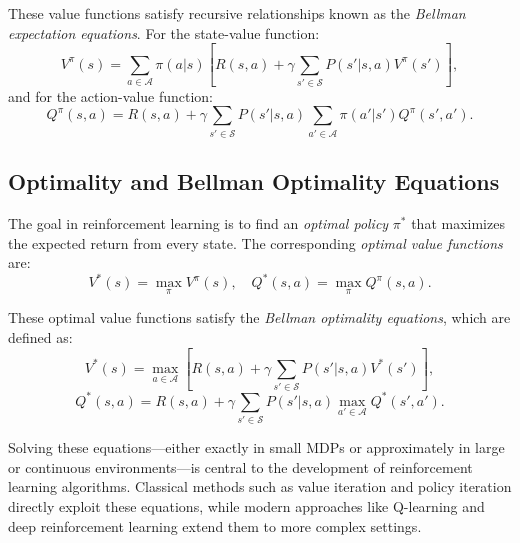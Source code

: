 These value functions satisfy recursive relationships known as the \textit{Bellman expectation equations}. For the state-value function:
\[
V^\pi(s) = \sum_{a \in \mathcal{A}} \pi(a|s) \left[ R(s, a) + \gamma \sum_{s' \in \mathcal{S}} P(s'|s, a) V^\pi(s') \right],
\]
and for the action-value function:
\[
Q^\pi(s, a) = R(s, a) + \gamma \sum_{s' \in \mathcal{S}} P(s'|s, a) \sum_{a' \in \mathcal{A}} \pi(a'|s') Q^\pi(s', a').
\]

\subsection{Optimality and Bellman Optimality Equations}

The goal in reinforcement learning is to find an \textit{optimal policy} $\pi^*$ that maximizes the expected return from every state. The corresponding \textit{optimal value functions} are:
\[
V^*(s) = \max_\pi V^\pi(s), \quad Q^*(s, a) = \max_\pi Q^\pi(s, a).
\]

These optimal value functions satisfy the \textit{Bellman optimality equations}, which are defined as:
\[
V^*(s) = \max_{a \in \mathcal{A}} \left[ R(s, a) + \gamma \sum_{s' \in \mathcal{S}} P(s'|s, a) V^*(s') \right],
\]
\[
Q^*(s, a) = R(s, a) + \gamma \sum_{s' \in \mathcal{S}} P(s'|s, a) \max_{a' \in \mathcal{A}} Q^*(s', a').
\]

Solving these equations—either exactly in small MDPs or approximately in large or continuous environments—is central to the development of reinforcement learning algorithms. Classical methods such as value iteration and policy iteration directly exploit these equations, while modern approaches like Q-learning and deep reinforcement learning extend them to more complex settings.

